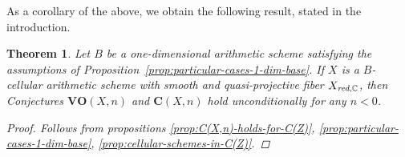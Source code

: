 \documentclass[10pt,a4paper,oneside]{article}
\newcommand{\CC}{\mathbb{C}}
\newcommand{\red}{\text{\it red}}
\theoremstyle{myplain}
\newtheorem{theorem}{Theorem}[section]
\theoremstyle{mydefinition}
\numberwithin{equation}{section}
\begin{document}
As a corollary of the above, we obtain the following result, stated in the
introduction.

\begin{theorem}
  Let $B$ be a one-dimensional arithmetic scheme satisfying the assumptions of
  Proposition~\ref{prop:particular-cases-1-dim-base}. If $X$ is a $B$-cellular
  arithmetic scheme with smooth and quasi-projective fiber $X_{\red,\CC}$, then
  Conjectures $\mathbf{VO} (X,n)$ and $\mathbf{C} (X,n)$ hold unconditionally
  for any $n < 0$.

  \begin{proof}
    Follows from propositions
    \ref{prop:C(X,n)-holds-for-C(Z)},
    \ref{prop:particular-cases-1-dim-base},
    \ref{prop:cellular-schemes-in-C(Z)}.
  \end{proof}
\end{theorem}

\end{document}
